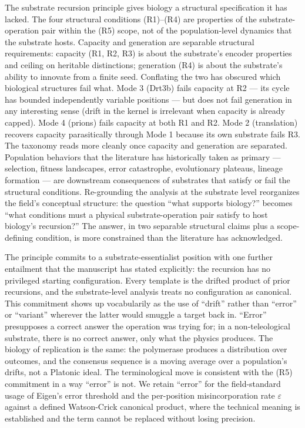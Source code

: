 \documentclass[aps,prx,reprint,amsmath,amssymb,floatfix,superscriptaddress,nofootinbib]{revtex4-2}
\theoremstyle{plain-thm}
\theoremstyle{definition-thm}
\begin{document}
The substrate recursion principle gives biology a structural specification it has lacked. The four structural conditions (R1)--(R4) are properties of the substrate-operation pair within the (R5) scope, not of the population-level dynamics that the substrate hosts. Capacity and generation are separable structural requirements: capacity (R1, R2, R3) is about the substrate's encoder properties and ceiling on heritable distinctions; generation (R4) is about the substrate's ability to innovate from a finite seed. Conflating the two has obscured which biological structures fail what. Mode 3 (Drt3b) fails capacity at R2 --- its cycle has bounded independently variable positions --- but does not fail generation in any interesting sense (drift in the kernel is irrelevant when capacity is already capped). Mode 4 (prions) fails capacity at both R1 and R2. Mode 2 (translation) recovers capacity parasitically through Mode 1 because its own substrate fails R3. The taxonomy reads more cleanly once capacity and generation are separated. Population behaviors that the literature has historically taken as primary --- selection, fitness landscapes, error catastrophe, evolutionary plateaus, lineage formation --- are downstream consequences of substrates that satisfy or fail the structural conditions. Re-grounding the analysis at the substrate level reorganizes the field's conceptual structure: the question ``what supports biology?'' becomes ``what conditions must a physical substrate-operation pair satisfy to host biology's recursion?'' The answer, in two separable structural claims plus a scope-defining condition, is more constrained than the literature has acknowledged.

The principle commits to a substrate-essentialist position with one further entailment that the manuscript has stated explicitly: the recursion has no privileged starting configuration. Every template is the drifted product of prior recursions, and the substrate-level analysis treats no configuration as canonical. This commitment shows up vocabularily as the use of ``drift'' rather than ``error'' or ``variant'' wherever the latter would smuggle a target back in. ``Error'' presupposes a correct answer the operation was trying for; in a non-teleological substrate, there is no correct answer, only what the physics produces. The biology of replication is the same: the polymerase produces a distribution over outcomes, and the consensus sequence is a moving average over a population's drifts, not a Platonic ideal. The terminological move is consistent with the (R5) commitment in a way ``error'' is not. We retain ``error'' for the field-standard usage of Eigen's error threshold and the per-position misincorporation rate $\varepsilon$ against a defined Watson-Crick canonical product, where the technical meaning is established and the term cannot be replaced without losing precision.
\end{document}
